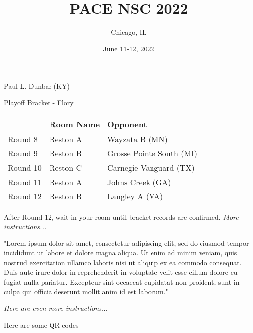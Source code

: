 \documentclass{article}%
\title{PACE NSC 2022}%
\author{Chicago, IL}%
\date{June 11{-}12, 2022}%
\begin{document}
%
\normalsize%
%

\begin{center}%
\begin{Huge}%
{Paul L. Dunbar (KY)}%
\end{Huge}%
\end{center}%
\begin{center}
\begin{LARGE}
Playoff Bracket {-} Flory%
\end{LARGE}
\end{center}
\begin{center}
\fontsize{12}{16}\selectfont
\begin{tabular}{|l|l|l|}
\hline
&Room Name&Opponent\\%
\hline%
Round 8&Reston A&Wayzata B (MN)\\%
Round 9&Reston B&Grosse Pointe South (MI)\\%
Round 10&Reston C&Carnegie Vanguard (TX)\\%
Round 11&Reston A&Johns Creek (GA)\\%
Round 12&Reston B&Langley A (VA)\\%
\hline
\end{tabular}%
\end{center}
After Round 12, wait in your room until bracket records are confirmed. \textit{More instructions...} \par\medskip\flushleft
"Lorem ipsum dolor sit amet, consectetur adipiscing elit, sed do eiusmod tempor incididunt ut labore et dolore magna aliqua. Ut enim ad minim veniam, quis nostrud exercitation ullamco laboris nisi ut aliquip ex ea commodo consequat. Duis aute irure dolor in reprehenderit in voluptate velit esse cillum dolore eu fugiat nulla pariatur. Excepteur sint occaecat cupidatat non proident, sunt in culpa qui officia deserunt mollit anim id est laborum."\par
\medskip

\textit{Here are even more instructions...}
\\[80pt]%
\begin{center}
\begin{Huge}
Here are some QR codes
\end{Huge}%
\end{center}
\pagebreak
\end{document}
